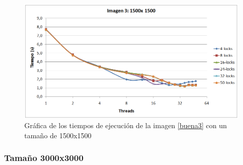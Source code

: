 \begin{figure}[H]
	\captionsetup{justification=centering}
	\centering
	\includegraphics[width=.9\textwidth]{./imagenes/graf3-1500}
	\caption{Gr\'{a}fica de los tiempos de ejecuci\'{o}n de la imagen \ref{buena3} con un tama\~{n}o de 1500x1500}	
	\label{graf3-1500}
\end{figure}


\subsubsection{Tama\~{n}o 3000x3000}


